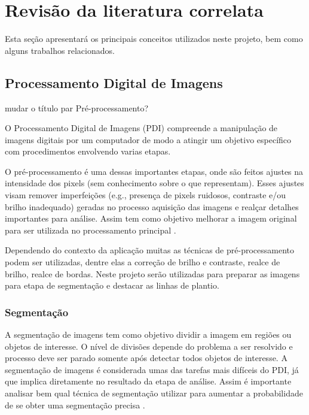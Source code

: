 \documentclass[12pt, a4paper, english, brazil]{article}
\newcommand{\textRed}[1]{{{\color{red} #1}}}
\begin{document}
\section{Revisão da literatura correlata}

Esta seção apresentará os principais conceitos utilizados neste projeto, bem como alguns trabalhos relacionados.

\subsection{Processamento Digital de Imagens}

\textRed{mudar o título par Pré-processamento?}

O Processamento Digital de Imagens (PDI) compreende a manipulação de imagens digitais por um computador de modo a atingir um objetivo específico com procedimentos envolvendo varias etapas. 

O pré-processamento é uma dessas importantes etapas, onde são feitos ajustes na intensidade dos pixels (sem conhecimento sobre o que representam). Esses ajustes visam remover imperfeições (e.g., presença de pixels ruidosos, contraste e/ou brilho inadequado) geradas no processo aquisição das imagens e realçar detalhes importantes para análise. Assim tem como objetivo melhorar a imagem original para ser utilizada no processamento principal \cite{Marques_Filho_1999}.

Dependendo do contexto da aplicação muitas as técnicas de pré-processamento podem ser utilizadas, dentre elas a correção de brilho e contraste, realce de brilho, realce de bordas. Neste projeto serão utilizadas para preparar as imagens para etapa de segmentação e destacar as linhas de plantio.

\subsubsection{Segmentação}
A segmentação de imagens tem como objetivo dividir a imagem em regiões ou objetos de interesse. O nível de divisões depende do problema a ser resolvido e processo deve ser parado somente após detectar todos objetos de interesse. A segmentação de imagens é considerada umas das tarefas mais difíceis do PDI, já que implica diretamente no resultado da etapa de análise. Assim é importante analisar bem qual técnica de segmentação utilizar para aumentar a probabilidade de se obter uma segmentação precisa \cite{Gonzalez_Woods_2010}.
\end{document}
